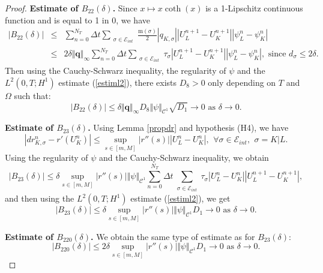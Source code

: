 \documentclass[smallextended]{svjour3}
\begin{document}
\begin{proof}
\textbf{Estimate of $B_{22}(\delta)$.} Since $x \mapsto x\coth(x)$ is a 1-Lipschitz continuous function and is equal to 1 in 0, we have
\begin{eqnarray*}
\left|B_{22}(\delta)\right| &\leq & \sum_{n=0}^{N_{T}}\Delta t\sum_{\substack{\sigma \in \mathcal{E}_{int}}} \frac{\text{m}(\sigma)}{2}\left| q_{K,\sigma}\right| \left| U_{L}^{n+1}-U_{K}^{n+1}\right| \left| \psi_{L}^{n}-\psi_{K}^{n}\right|\\
& \leq & 2\delta \Vert \textbf{q} \Vert_{\infty}\sum_{n=0}^{N_{T}}\Delta t\sum_{\substack{\sigma \in \mathcal{E}_{int}}} \tau_{\sigma}\left| U_{L}^{n+1}-U_{K}^{n+1}\right| \left| \psi_{L}^{n}-\psi_{K}^{n}\right|, \text{ since $d_{\sigma} \leq 2 \delta$.}
\end{eqnarray*}
Then using the Cauchy-Schwarz inequality, the regularity of $\psi$ and the $L^{2}(0,T;H^{1})$ estimate (\ref{estiml2}), there exists $D_{8}>0$ only depending on $T$ and $\Omega$ such that:
\begin{equation*}
\left| B_{22}(\delta)\right| \leq \delta \Vert \textbf{q}\Vert_{\infty} D_{8} \Vert \psi \Vert_{\mathcal{C}^{1}} \sqrt{D_{1}} \longrightarrow 0 \text{ as } \delta \rightarrow 0.
\end{equation*}

\textbf{Estimate of $B_{23}(\delta)$.} Using Lemma \ref{propdr} and hypothesis (H4), we have
\begin{equation*}
\left| dr^{n}_{K,\sigma}-r'(U^{n}_{K})\right| \leq \sup_{s \in [m,M]}|r''(s)| \left|U_{L}^{n}-U^{n}_{K}\right|, \,\ \forall \sigma \in \mathcal{E}_{int}, \,\ \sigma=K|L.
\end{equation*}
Using the regularity of $\psi$ and the Cauchy-Schwarz inequality, we obtain
\begin{equation*}
\left| B_{23}(\delta) \right| \leq \delta \sup_{s \in [m,M]}|r''(s)| \Vert \psi \Vert_{\mathcal{C}^{1}} \sum_{n=0}^{N_{T}}\Delta t\sum_{\substack{\sigma \in \mathcal{E}_{int}}} \tau_{\sigma} \left|U_{L}^{n}-U^{n}_{K}\right| \left|U_{L}^{n+1}-U^{n+1}_{K}\right|,
\end{equation*}
and then using the $L^{2}(0,T;H^{1})$ estimate (\ref{estiml2}), we get
\begin{equation*}
\left| B_{23}(\delta) \right| \leq \delta \sup_{s \in [m,M]}|r''(s)| \Vert \psi \Vert_{\mathcal{C}^{1}} D_{1} \longrightarrow 0 \text{ as } \delta \rightarrow 0.
\end{equation*}

\textbf{Estimate of $B_{220}(\delta)$.} We obtain the same type of estimate as for $B_{23}(\delta)$:
\begin{equation*}
\left| B_{220}(\delta) \right| \leq 2\delta \sup_{s \in [m,M]}|r''(s)| \Vert \psi \Vert_{\mathcal{C}^{1}} D_{1} \longrightarrow 0 \text{ as } \delta \rightarrow 0.
\end{equation*}



\end{proof}
\end{document}
